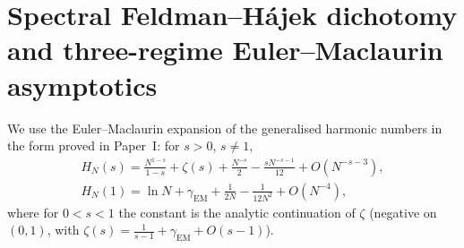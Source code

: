 \documentclass[11pt,reqno]{amsart}
\theoremstyle{plain}
\theoremstyle{definition}
\theoremstyle{remark}
\numberwithin{equation}{section}
\newcommand{\gEM}{\gamma_{\mathrm{EM}}}
\begin{document}
\section{Spectral Feldman--H\'ajek dichotomy and three-regime Euler--Maclaurin asymptotics}
\label{sec:asymptotics}

We use the Euler--Maclaurin expansion of the generalised harmonic numbers in the form proved in Paper~I: for $s>0$, $s\ne1$,
\begin{equation}\label{eq:EM}
\begin{gathered}
H_N(s)=\frac{N^{1-s}}{1-s}+\zeta(s)+\frac{N^{-s}}2-\frac{sN^{-s-1}}{12}+O(N^{-s-3}),\\
H_N(1)=\ln N+\gEM+\frac1{2N}-\frac1{12N^2}+O(N^{-4}),
\end{gathered}
\end{equation}
where for $0<s<1$ the constant is the analytic continuation of $\zeta$ (negative on $(0,1)$, with $\zeta(s)=\frac1{s-1}+\gEM+O(s-1)$).
\end{document}
